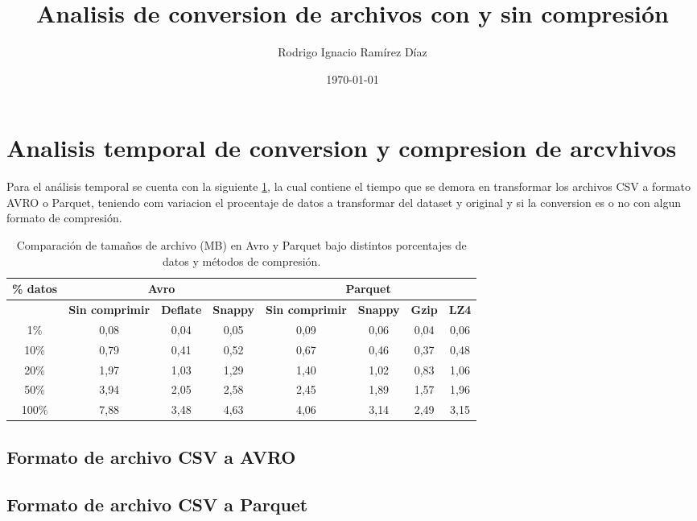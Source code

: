 \documentclass{article}
\title{Analisis de conversion de archivos con y sin compresión}
\author{Rodrigo Ignacio Ramírez Díaz}
\date{\today}
\begin{document}
	\maketitle
	
	\section{Analisis temporal de conversion y compresion de arcvhivos}
	
		Para el análisis temporal se cuenta con la siguiente \ref{tab:avro_parquet}, la cual contiene el tiempo que se demora en transformar los archivos CSV a formato AVRO o Parquet, teniendo com variacion el procentaje de datos a transformar del dataset y original y si la conversion es o no con algun formato de compresión.
		
		\begin{table}[h!]
			\centering
			\begin{tabular}{|c|ccc|cccc|}
				\hline
				\textbf{\% datos} & \multicolumn{3}{c|}{\textbf{Avro}} & \multicolumn{4}{c|}{\textbf{Parquet}} \\ \hline
				& \textbf{Sin comprimir} & \textbf{Deflate} & \textbf{Snappy} & \textbf{Sin comprimir} & \textbf{Snappy} & \textbf{Gzip} & \textbf{LZ4} \\ \hline
				1\% & 0{,}08 & 0{,}04 & 0{,}05 & 0{,}09 & 0{,}06 & 0{,}04 & 0{,}06 \\
				10\% & 0{,}79 & 0{,}41 & 0{,}52 & 0{,}67 & 0{,}46 & 0{,}37 & 0{,}48 \\
				20\% & 1{,}97 & 1{,}03 & 1{,}29 & 1{,}40 & 1{,}02 & 0{,}83 & 1{,}06 \\
				50\% & 3{,}94 & 2{,}05 & 2{,}58 & 2{,}45 & 1{,}89 & 1{,}57 & 1{,}96 \\
				100\% & 7{,}88 & 3{,}48 & 4{,}63 & 4{,}06 & 3{,}14 & 2{,}49 & 3{,}15 \\ \hline
			\end{tabular}
			\caption{Comparación de tamaños de archivo (MB) en Avro y Parquet bajo distintos porcentajes de datos y métodos de compresión.}
			\label{tab:avro_parquet}
		\end{table}
		
	
		\subsection{Formato de archivo CSV a AVRO}
		\subsection{Formato de archivo CSV a Parquet}
	
\end{document}
